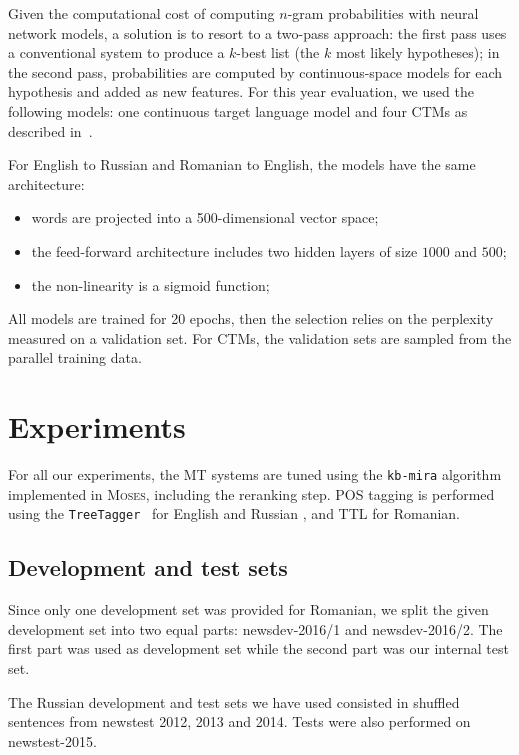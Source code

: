 \documentclass[11pt]{article}
\newcommand{\moses}{\textsc{Moses}\xspace}
\newcommand{\ngram}{\mbox{$n$-gram}\xspace}
\newcommand{\kbmira}{\texttt{kb-mira}\xspace}
\begin{document}
Given the computational cost of computing \ngram{} probabilities with
neural network models, a solution is to resort to a two-pass approach:
the first pass uses a conventional system to produce a $k$-best list
(the $k$ most likely hypotheses); in the second pass, probabilities
are computed by continuous-space models for each hypothesis and added
as new features.  For this year evaluation, we used the following
models: one continuous target language model and four CTMs as
described in~\cite{Le12continuous}. 

For English to Russian and Romanian to English, the models have the
same architecture:
\begin{itemize}
\item words are projected into a 500-dimensional vector space; %
\item the feed-forward architecture includes two hidden layers of
  size $1000$ and $500$;
\item the non-linearity is a sigmoid function;
\end{itemize}
All models are trained for 20 epochs, then the selection relies on
the perplexity measured on a validation set. For CTMs, the validation
sets are sampled from the parallel training data.

\section{Experiments}
\label{sec:exp}
For all our experiments, the MT systems are tuned using the \kbmira
algorithm~\cite{cherry2012batch} implemented in \moses, including the
reranking step.  POS tagging is performed using the
\texttt{TreeTagger}~\cite{Schmid94treetagger} for English and Russian
\cite{Sharoff11}, and TTL \cite{Tufis_racai} for Romanian.

\subsection{Development and test sets}

Since only one development set was provided for Romanian, we split the
given development set into two equal parts: newsdev-2016/1 and newsdev-2016/2.
The first part was used as development set while the second part was our
internal test set.

The Russian development and test sets we have used consisted in shuffled
sentences from newstest 2012, 2013 and 2014. Tests were also performed on
newstest-2015.
\end{document}
